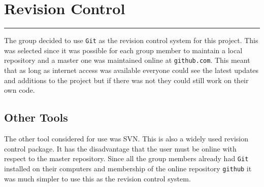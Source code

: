\section{Revision Control}
\vspace{-2em}\rule{\textwidth}{1pt}\vspace{1em}

The group decided to use \texttt{Git} as the revision control system for this project.
This was selected since it was possible for each group member to maintain a local repository and a master one was maintained online at \texttt{github.com}.
This meant that as long as internet access was available everyone could see the latest updates and additions to the project but if there was not they could still work on their own code.

\subsection{Other Tools}
The other tool considered for use was SVN.
This is also a widely used revision control package.
It has the disadvantage that the user must be online with respect to the master repository.
Since all the group members already had \texttt{Git} installed on their computers and membership of the online repository \texttt{github} it was much simpler to use this as the revision control system.


